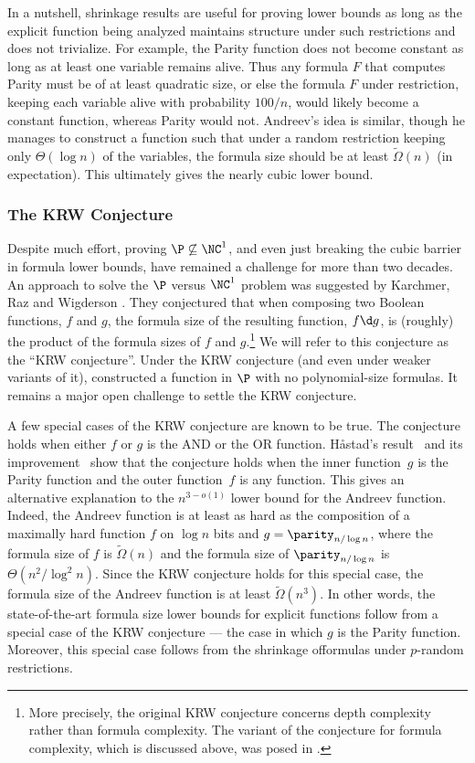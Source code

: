 \documentclass{toc}
\begin{document}
In a nutshell, shrinkage results are useful %
for  %
proving lower bounds
as long as the explicit function being analyzed maintains structure
under such restrictions and does not trivialize. For example, the
Parity function does not become constant as long as at least one variable
remains alive. Thus any formula $F$ that computes Parity must be
of at least quadratic size, or else the formula $F$ under restriction,
keeping each variable alive with probability $100/n$, would likely
become a constant function, whereas Parity would not. Andreev's idea
is similar, though he manages to construct a function such that under
a random restriction keeping only $\Theta(\log n)$ of the variables,
the formula size should be at least $\tilde{\Omega}(n)$ (in expectation).
This ultimately gives the nearly cubic lower bound.

%
\subsubsection{The KRW Conjecture}  %

Despite much effort, proving $\P\not\subseteq\NC^{1}$, and even just
breaking the \textsf{cubic barrier} in formula lower bounds, have
remained a challenge for more than two decades. An approach to solve
the $\P$ versus $\NC^{1}$ problem was suggested by Karchmer, Raz
and Wigderson \cite{KRW95}. They conjectured that when composing
two Boolean functions, $f$ and $g$, the formula size of the resulting
function, $f\d g$, is (roughly) the product of the formula sizes
of $f$ and $g$.\footnote{More precisely, the original KRW conjecture \cite{KRW95} concerns
depth complexity rather than formula complexity. The variant of the
conjecture for formula complexity, which is discussed above, was posed
in \cite{GMWW17}. } We will refer to this conjecture as the \textsf{``KRW conjecture''}.
Under the KRW conjecture (and even under weaker variants of it), \cite{KRW95}
constructed a function in $\P$ with no polynomial-size formulas.
It remains a major open challenge to settle the KRW conjecture.

A few special cases of the KRW conjecture are known to be true. The
conjecture holds when either $f$ or $g$ is the AND or the OR function.
H{\aa}stad's result~\cite{H98} and its improvement~\cite{T14}
show that the conjecture holds when the inner function~$g$ is the
Parity function and the outer function~$f$ is any function. This
gives an alternative explanation to the $n^{3-o(1)}$ lower bound
for the Andreev function. Indeed, the Andreev function is at least
as hard as the composition of a maximally hard function $f$ on $\log n$
bits and $g=\parity_{n/\log n}$, where the formula size of $f$ is
$\tilde{\Omega}(n)$ and the formula size of $\parity_{n/\log n}$
is $\Theta(n^{2}/\log^{2}n)$. Since the KRW conjecture holds for
this special case, the formula size of the Andreev function is at
least $\tilde{\Omega}(n^{3})$. In other words, the state-of-the-art
formula size lower bounds for explicit functions follow from a special
case of the KRW conjecture --- the case in which $g$ is the Parity
function. Moreover, this special case follows from the shrinkage offormulas under $p$-random restrictions.
\end{document}
